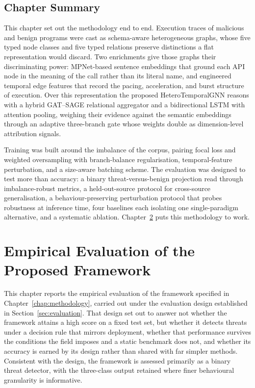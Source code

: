 \documentclass[%
    BCOR=10mm,
    DIV=13,
    toc=bibliography,
    toc=listof,
    oneside,
    12pt,
]{scrbook}
\begin{document}
\section{Chapter Summary}
\label{sec:methodology_summary}

This chapter set out the methodology end to end. Execution traces of malicious
and benign programs were cast as schema-aware heterogeneous graphs, whose five
typed node classes and five typed relations preserve distinctions a flat
representation would discard. Two enrichments give those graphs their
discriminating power: MPNet-based sentence embeddings that ground each API node
in the meaning of the call rather than its literal name, and engineered temporal
edge features that record the pacing, acceleration, and burst structure of
execution. Over this representation the proposed HeteroTemporalGNN reasons with
a hybrid GAT--SAGE relational aggregator and a bidirectional LSTM with attention
pooling, weighing their evidence against the semantic embeddings through an
adaptive three-branch gate whose weights double as dimension-level attribution
signals.

Training was built around the imbalance of the corpus, pairing focal loss and
weighted oversampling with branch-balance regularisation, temporal-feature
perturbation,
and a size-aware batching scheme. The evaluation was designed to test more than
accuracy: a binary threat-versus-benign projection read through imbalance-robust
metrics, a held-out-source protocol for cross-source generalisation, a
behaviour-preserving perturbation protocol that probes robustness at inference
time, four baselines each isolating one single-paradigm alternative, and a
systematic ablation. Chapter~\ref{chap:results} puts this methodology to work.

\chapter{Empirical Evaluation of the Proposed Framework}
\label{chap:results}

This chapter reports the empirical evaluation of the framework specified in
Chapter~\ref{chap:methodology}, carried out under the evaluation design
established in Section~\ref{sec:evaluation}. That design set out to answer not
whether the framework attains a high score on a fixed test set, but whether it
detects threats under a decision rule that mirrors deployment, whether that
performance survives the conditions the field imposes and a static benchmark
does not, and whether its accuracy is earned by its design rather than shared
with far simpler methods. Consistent with the design, the framework is assessed
primarily as a binary threat detector, with the three-class output retained
where finer behavioural granularity is informative.
\end{document}
